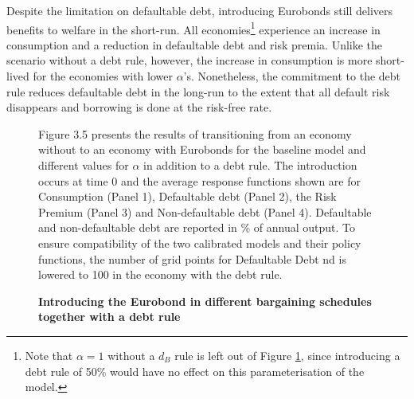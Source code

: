 Despite the limitation on defaultable debt, introducing Eurobonds still delivers benefits to welfare in the short-run. All economies\footnote{Note that $\alpha = 1$ without a $d_B$ rule is left out of Figure \ref{fig:intro_debtrule}, since introducing a debt rule of 50\% would have no effect on this parameterisation of the model.} experience an increase in consumption and a reduction in defaultable debt and risk premia. Unlike the scenario without a debt rule, however, the increase in consumption is more short-lived for the economies with lower $\alpha$'s. Nonetheless, the commitment to the debt rule reduces defaultable debt in the long-run to the extent that all default risk disappears and borrowing is done at the risk-free rate.\\
 \begin{figure}[H]
\caption{\textbf{Introducing the Eurobond in different bargaining schedules together with a debt rule}}
    \centering
    \vspace{1mm}
    \label{fig:intro_debtrule}
        \begin{tablenotes}
      \footnotesize
   Figure 3.5 presents the results of transitioning from an economy without to an economy with Eurobonds for the baseline model and different values for $\alpha$ in addition to a debt rule. The introduction occurs at time 0 and the average response functions shown are for Consumption (Panel 1), Defaultable debt (Panel 2), the Risk Premium (Panel 3) and Non-defaultable debt (Panel 4). Defaultable and non-defaultable debt are reported in \% of annual output. To ensure compatibility of the two calibrated models and their policy functions, the number of grid points for Defaultable Debt nd is lowered to 100 in the economy with the debt rule.
    \end{tablenotes}
\end{figure}
